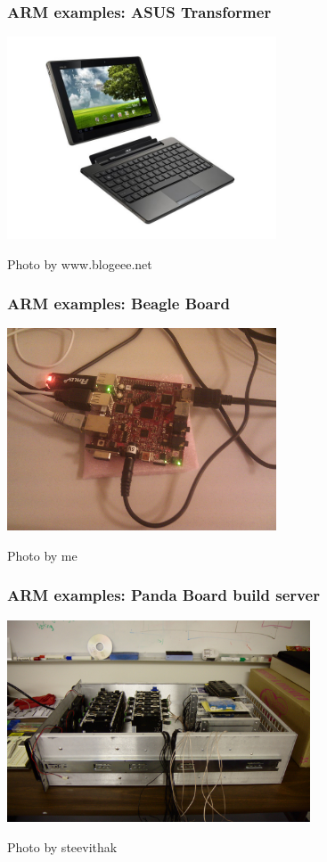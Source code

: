 \documentclass{beamer}
\begin{document}
\begin{frame}[t]
\frametitle{ARM examples: ASUS Transformer}
\begin{center}
\includegraphics[height=6cm]{Transformer.jpg}

{\scriptsize Photo by www.blogeee.net}
\end{center}
\end{frame}

\begin{frame}[t]
\frametitle{ARM examples: Beagle Board}
\begin{center}
\includegraphics[height=6cm]{Beagle.jpg}

{\scriptsize Photo by me}
\end{center}
\end{frame}

\begin{frame}[t]
\frametitle{ARM examples: Panda Board build server}
\begin{center}
\includegraphics[height=6cm]{server.jpg}

{\scriptsize Photo by steevithak}
\end{center}
\end{frame}
\end{document}
